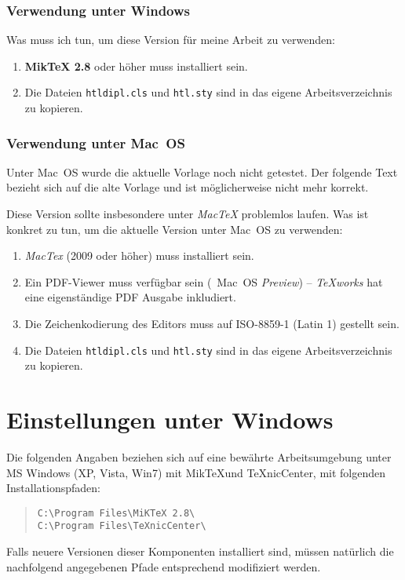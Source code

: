 \subsubsection*{Verwendung unter Windows}
Was muss ich tun, um diese Version für meine Arbeit zu verwenden:
\begin{enumerate}
\item \textbf{MikTeX 2.8} oder höher muss installiert sein.
\item Die Dateien \texttt{htldipl.cls} und \texttt{htl.sty} sind in das eigene
Arbeitsverzeichnis zu kopieren.
\end{enumerate}

\subsubsection*{Verwendung unter Mac~OS}

Unter Mac~OS wurde die aktuelle Vorlage noch nicht getestet. Der folgende Text bezieht sich auf die alte Vorlage und ist möglicherweise nicht mehr korrekt.

Diese Version sollte insbesondere unter \emph{MacTeX} problemlos laufen.
Was ist konkret zu tun, um die aktuelle Version unter Mac~OS zu verwenden:
\begin{enumerate}
\item \emph{MacTex} (2009 oder höher) muss installiert sein.
\item Ein PDF-Viewer muss verfügbar sein (\zB\ Mac~OS \emph{Preview}) -- \emph{TeXworks} hat eine eigenständige PDF Ausgabe inkludiert.
\item Die Zeichenkodierung des Editors muss auf ISO-8859-1 (Latin 1) gestellt sein.
\item Die Dateien \texttt{htldipl.cls} und \texttt{htl.sty} sind in das eigene
Arbeitsverzeichnis zu kopieren.
\end{enumerate}

\section{Einstellungen unter Windows} 
\label{sec:EinstellungAusgabeprofile}

Die folgenden Angaben beziehen sich auf eine bewährte Arbeitsumgebung unter MS Windows (XP, Vista, Win7) mit MikTeXund TeXnicCenter, mit folgenden Installationspfaden:
%
\begin{quote}
\verb!C:\Program Files\MiKTeX 2.8\! \\
\verb!C:\Program Files\TeXnicCenter\! 
\end{quote}
%
Falls neuere Versionen dieser Komponenten installiert sind, müssen natürlich die nachfolgend angegebenen Pfade entsprechend modifiziert werden.


